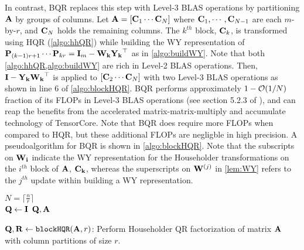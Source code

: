 In contrast, BQR replaces this step with Level-3 BLAS operations by partitioning $\mathbf{A}$ by groups of columns.
Let $\mathbf{A} = [\mathbf{C}_1 \cdots  \mathbf{C}_N]$ where $\mathbf{C}_1,\cdots,\mathbf{C}_{N-1}$ are each $m$-by-$r$, and $\mathbf{C}_N$ holds the remaining columns.
The $k^{th}$ block, $\mathbf{C}_k$, is transformed using HQR (\cref{algo:hhQR}) while building the WY representation of $\mathbf{P}_{(k-1)r+1}\cdots\mathbf{P}_{kr} = \mathbf{I}_m -\mathbf{W_k}\mathbf{Y_k}^{\top}$ as in \cref{algo:buildWY}.
Note that both \cref{algo:hhQR,algo:buildWY} are rich in Level-2 BLAS operations.
Then, $\mathbf{I} -\mathbf{Y_k}\mathbf{W_k}^{\top}$ is applied to $[\mathbf{C}_2 \cdots  \mathbf{C}_N]$ with two Level-3 BLAS operations as shown in line 6 of \cref{algo:blockHQR}.
BQR performs approximately $1-\mathcal{O}(1/N)$ fraction of its FLOPs in Level-3 BLAS operations (see section 5.2.3 of \cite{golub2013matrix}), and can reap the benefits from the accelerated matrix-matrix-multiply and accumulate technology of TensorCore. 
Note that BQR does require more FLOPs when compared to HQR, but these additional FLOPs are negligble in high precision.
A pseudoalgorithm for BQR is shown in \cref{algo:blockHQR}.
Note that the subscripts on $\mathbf{W_i}$ indicate the WY representation for the Householder transformations on the $i^{th}$ block of $\mathbf{A}$, $\mathbf{C_k}$, whereas the superscripts on $\mathbf{W}^{(j)}$ in \cref{lem:WY} refers to the $j^{th}$ update within building a WY representation. 
\begin{algorithm2e}
	\DontPrintSemicolon %
	$N=\lceil \frac{n}{r}\rceil$\\
	$\mathbf{Q}\gets \mathbf{I}$
	\Return $\mathbf{Q},\mathbf{A}$
	\caption{\label{algo:blockHQR} $\mathbf{Q},\mathbf{R}\gets {\tt blockHQR}(\mathbf{A}, r)$: Perform Householder QR factorization of matrix $\mathbf{A}$ with column partitions of size $r$.}
\end{algorithm2e}
